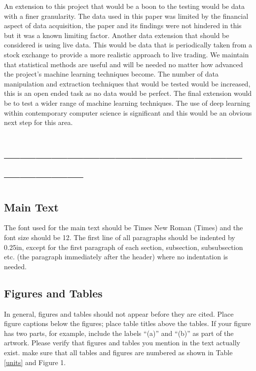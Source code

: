 \documentclass[conference]{IEEEtran}
\begin{document}
An extension to this project that would be a boon to the testing would be data with a finer granularity. The data used in this paper was limited by the financial aspect of data acquisition, the paper and its findings were not hindered in this but it was a known limiting factor. Another data extension that should be considered is using live data. This would be data that is periodically taken from a stock exchange to provide a more realistic approach to live trading. We maintain that statistical methods are useful and will be needed no matter how advanced the project's machine learning techniques become. The number of data manipulation and extraction techniques that would be tested would be increased, this is an open ended task as no data would be perfect. The final extension would be to test a wider range of machine learning techniques. The use of deep learning within contemporary computer science is significant and this would be an obvious next step for this area.

\nocite{*}

\iffalse
\section*{------------------------------------------------------------}

\subsection{Main Text}

The font used for the main text should be Times New Roman (Times) and the font size should be 12.  The first line of all paragraphs should be indented by 0.25in, except for the first paragraph of each section, subsection, subsubsection etc. (the paragraph immediately after the header) where no indentation is needed.

\subsection{Figures and Tables}
In general, figures and tables should not appear before they are cited.  Place figure captions below the figures; place table titles above the tables.  If your figure has two parts, for example, include the labels ``(a)'' and ``(b)'' as part of the artwork.  Please verify that figures and tables you mention in the text actually exist.  make sure that all tables and figures are numbered as shown in Table \ref{units} and Figure 1.
\end{document}
